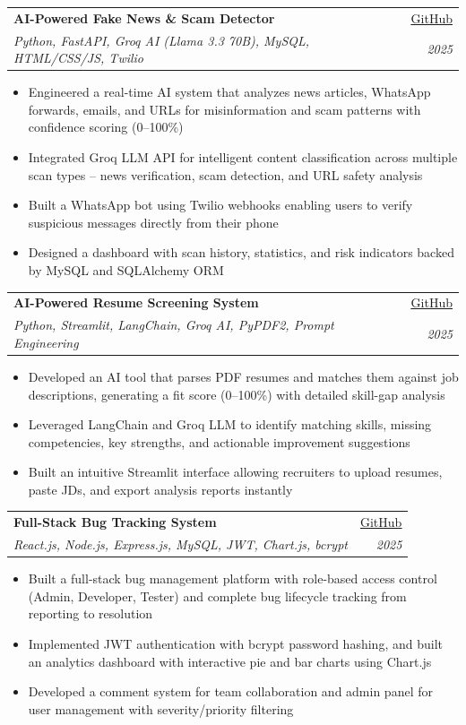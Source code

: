 \documentclass[letterpaper,11pt]{article}
\makeatletter
\newcommand{\resumeItem}[1]{
  \item\small{
    {#1 \vspace{-2pt}}
  }
}
\newcommand{\resumeProjectHeading}[4]{
    \vspace{-2pt}\item
    \begin{tabular*}{0.97\textwidth}[t]{l@{\extracolsep{\fill}}r}
      \textbf{#1} & #2 \\
      \textit{\small#3} & \textit{\small #4} \\
    \end{tabular*}\vspace{-7pt}
}
\newcommand{\resumeItemListStart}{\begin{itemize}\vspace{-2pt}}
\newcommand{\resumeItemListEnd}{\end{itemize}\vspace{-6pt}}
\makeatother
\begin{document}
      \resumeProjectHeading
          {AI-Powered Fake News \& Scam Detector}{\href{https://github.com/pragatisingh1556/truthscan-ai}{\underline{GitHub}}}
          {Python, FastAPI, Groq AI (Llama 3.3 70B), MySQL, HTML/CSS/JS, Twilio}{2025}
          \resumeItemListStart
            \resumeItem{Engineered a real-time AI system that analyzes news articles, WhatsApp forwards, emails, and URLs for misinformation and scam patterns with confidence scoring (0--100\%)}
            \resumeItem{Integrated Groq LLM API for intelligent content classification across multiple scan types -- news verification, scam detection, and URL safety analysis}
            \resumeItem{Built a WhatsApp bot using Twilio webhooks enabling users to verify suspicious messages directly from their phone}
            \resumeItem{Designed a dashboard with scan history, statistics, and risk indicators backed by MySQL and SQLAlchemy ORM}
          \resumeItemListEnd

      \resumeProjectHeading
          {AI-Powered Resume Screening System}{\href{https://github.com/pragatisingh1556/fitscore-ai}{\underline{GitHub}}}
          {Python, Streamlit, LangChain, Groq AI, PyPDF2, Prompt Engineering}{2025}
          \resumeItemListStart
            \resumeItem{Developed an AI tool that parses PDF resumes and matches them against job descriptions, generating a fit score (0--100\%) with detailed skill-gap analysis}
            \resumeItem{Leveraged LangChain and Groq LLM to identify matching skills, missing competencies, key strengths, and actionable improvement suggestions}
            \resumeItem{Built an intuitive Streamlit interface allowing recruiters to upload resumes, paste JDs, and export analysis reports instantly}
          \resumeItemListEnd

      \resumeProjectHeading
          {Full-Stack Bug Tracking System}{\href{https://github.com/pragatisingh1556/bugtracker}{\underline{GitHub}}}
          {React.js, Node.js, Express.js, MySQL, JWT, Chart.js, bcrypt}{2025}
          \resumeItemListStart
            \resumeItem{Built a full-stack bug management platform with role-based access control (Admin, Developer, Tester) and complete bug lifecycle tracking from reporting to resolution}
            \resumeItem{Implemented JWT authentication with bcrypt password hashing, and built an analytics dashboard with interactive pie and bar charts using Chart.js}
            \resumeItem{Developed a comment system for team collaboration and admin panel for user management with severity/priority filtering}
          \resumeItemListEnd
\end{document}
